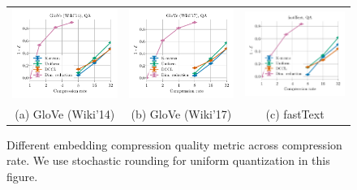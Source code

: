\begin{figure}
\begin{tabular}{@{\hskip -0.0in}c@{\hskip -0.0in}c@{\hskip -0.0in}c@{\hskip -0.0in}}
		\includegraphics[width=.245\linewidth]{figures/glove400k_synthetics-large-dim_subspace-dist-normalized_vs_compression_linx_stoc.pdf} &
		\includegraphics[width=.245\linewidth]{figures/glove-wiki400k-am_synthetics-large-dim_subspace-dist-normalized_vs_compression_linx_stoc.pdf} &
		\includegraphics[width=.245\linewidth]{figures/fasttext1m_synthetics-large-dim_subspace-dist-normalized_vs_compression_linx_stoc.pdf}	\\
		(a) GloVe (Wiki'14) & \;\;\;\;(b) GloVe (Wiki'17)  & \;\;\;\;\;\;(c) fastText
	\end{tabular}
	\caption{Different embedding compression quality metric across compression rate. We use stochastic rounding for uniform quantization in this figure. }
	\label{fig:metric_vs_correlation_stoc}
\end{figure}


